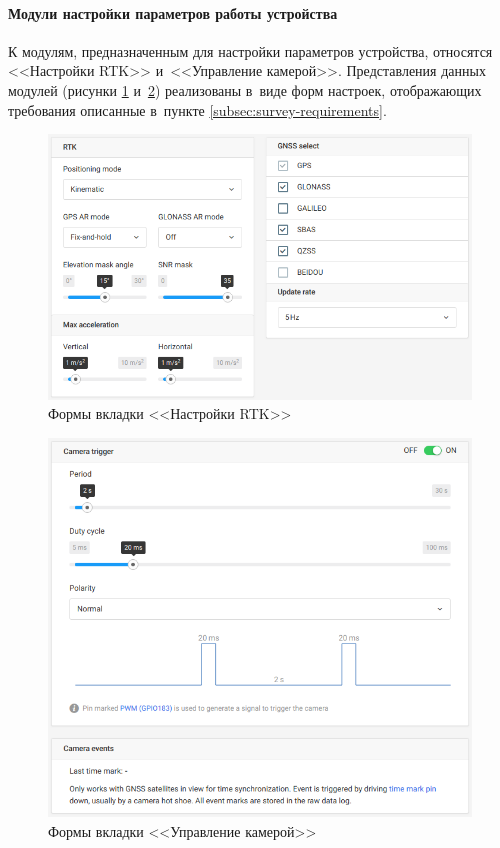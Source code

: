 \paragraph{Модули настройки параметров работы устройства}
\label{subsec:device-settings}

К модулям, предназначенным для настройки параметров устройства, относятся <<Настройки RTK>> и~<<Управление камерой>>. Представления данных модулей (рисунки \ref{fig:rtk-settings} и~\ref{fig:camera-control}) реализованы в~виде форм настроек, отображающих требования описанные в~пункте \ref{subsec:survey-requirements}.

\begin{figure}[h!]
  \centering
  \setlength{\fboxsep}{5pt}
  \includegraphics[width=.8\textwidth]{img/reachview/rtk-settings}
  \vspace*{6pt}
  \caption{Формы вкладки <<Настройки RTK>>}
  \label{fig:rtk-settings}
\end{figure}

\begin{figure}[h!]
  \centering
  \setlength{\fboxsep}{5pt}
  \includegraphics[width=.8\textwidth]{img/reachview/camera-control__cut}
  \vspace*{6pt}
  \caption{Формы вкладки <<Управление камерой>>}
  \label{fig:camera-control}
\end{figure}


